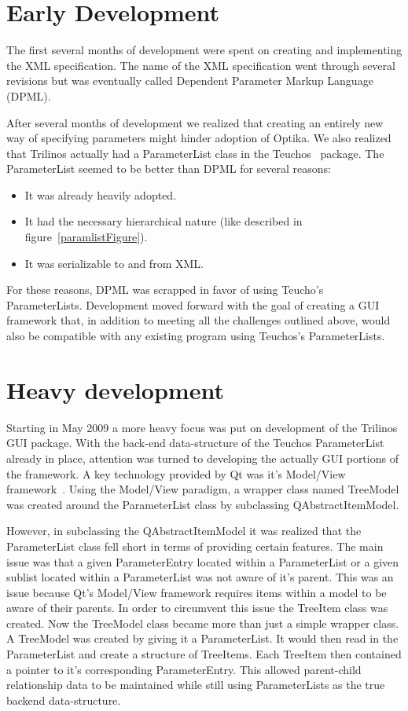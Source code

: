 \section{Early Development}
The first several months of development were spent on creating and implementing the XML
specification. The name of the XML specification went through several revisions but was
eventually called Dependent Parameter Markup Language (DPML).

After several months of development we realized that creating an entirely new way of specifying 
parameters might hinder adoption of Optika. We also realized that Trilinos actually had
a ParameterList class in the Teuchos~\cite{TeuchosPackage} package. The ParameterList seemed to be better than DPML for
several reasons:
	\begin{itemize}
		\item It was already heavily adopted.
		\item It had the necessary hierarchical nature (like described in figure~\ref{paramlistFigure}).
		\item It was serializable to and from XML.
	\end{itemize}

For these reasons, DPML was scrapped in favor of using Teucho's ParameterLists. Development moved
forward with the goal of creating a GUI framework that, in addition to meeting all the challenges 
outlined above, would also be compatible with any existing program using Teuchos's ParameterLists.

\section{Heavy development}
Starting in May 2009 a more heavy focus was put on development of the Trilinos GUI package.
With the back-end data-structure of the Teuchos ParameterList already in place, attention
was turned to developing the actually GUI portions of the framework. A key technology provided by Qt was it's Model/View
framework~\cite{QtModelView}. Using the Model/View paradigm, a wrapper class named TreeModel
was created around the ParameterList class by subclassing QAbstractItemModel.

However, in subclassing the QAbstractItemModel it was realized that the ParameterList class fell short 
in terms of providing certain features. The main issue was that a given ParameterEntry located within
a ParameterList or a given sublist located within a ParameterList was not aware of it's parent.
This was an issue because Qt's Model/View framework requires items within a model to be aware of
their parents. In order to circumvent this issue the TreeItem class was created. Now the TreeModel class
became more than just a simple wrapper class. A TreeModel was created by giving it a ParameterList.
It would then read in the ParameterList and create a structure of TreeItems.  Each TreeItem then contained a pointer 
to it's corresponding ParameterEntry. This allowed parent-child relationship data to be maintained while
still using ParameterLists as the true backend data-structure.

